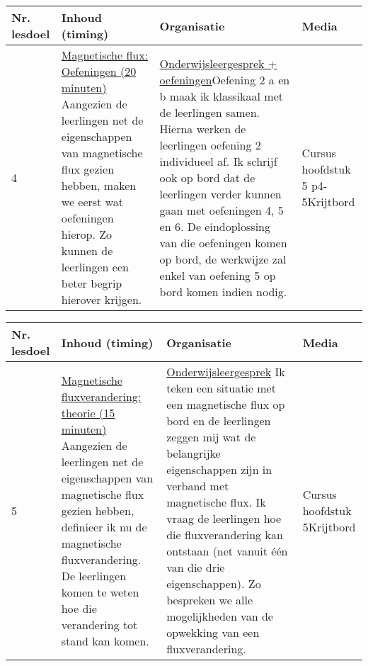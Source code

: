 \begin{landscape}
\begin{tabularx}{1.56\textwidth}{|p{1.5cm}|p{9cm}|X|p{4cm}|}
	\hline
	\textbf{Nr. lesdoel } & \textbf{Inhoud (timing)}  & \textbf{Organisatie } & \textbf{Media } \\ \hline
	4& \underline{Magnetische flux: Oefeningen (20 minuten)}\newline
	Aangezien de leerlingen net de eigenschappen van magnetische flux gezien hebben, maken we eerst wat oefeningen hierop. Zo kunnen de leerlingen een beter begrip hierover krijgen.
	&  \underline{Onderwijsleergesprek + oefeningen}\newline  Oefening 2 a en b maak ik klassikaal met de leerlingen samen. Hierna werken de leerlingen oefening 2 individueel af. Ik schrijf ook op bord dat de leerlingen verder kunnen gaan met oefeningen 4, 5 en 6. De eindoplossing van die oefeningen komen op bord, de werkwijze zal enkel van oefening 5 op bord komen indien nodig.
	&  Cursus hoofdstuk 5 p4-5\newline\newline Krijtbord
	\\ \hline
\end{tabularx}\vspace{5mm}


\begin{tabularx}{1.56\textwidth}{|p{1.5cm}|p{9cm}|X|p{4cm}|}
\hline
\textbf{Nr. lesdoel } & \textbf{Inhoud (timing)}  & \textbf{Organisatie } & \textbf{Media } \\ \hline
5& \underline{Magnetische fluxverandering: theorie (15 minuten)}\newline
Aangezien de leerlingen net de eigenschappen van magnetische flux gezien hebben, definieer ik nu de magnetische fluxverandering. De leerlingen komen te weten hoe die verandering tot stand kan komen.
&  \underline{Onderwijsleergesprek}\newline 
Ik teken een situatie met een magnetische flux op bord en de leerlingen zeggen mij wat de belangrijke eigenschappen zijn in verband met magnetische flux. Ik vraag de leerlingen hoe die fluxverandering kan ontstaan (net vanuit één van die drie eigenschappen). Zo bespreken we alle mogelijkheden van de opwekking van een fluxverandering.	
&  Cursus hoofdstuk 5\newline\newline Krijtbord
\\ \hline
\end{tabularx}\vspace{5mm}




\end{landscape}
